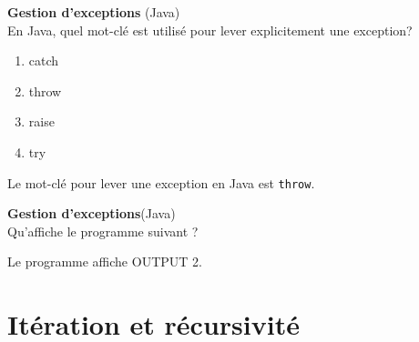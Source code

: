 \begin{Exercice}[5 minutes]\textbf{Gestion d'exceptions} (Java)\\

    En Java, quel mot-clé est utilisé pour lever explicitement une exception?

    \begin{enumerate}
        \item catch
        \item throw
        \item raise 
        \item try
    \end{enumerate}
    
    \begin{solution}   
    Le mot-clé pour lever une exception en Java est \lstinline{throw}.
        
    \end{solution}
        
 \end{Exercice}

 \begin{Exercice}[5 minutes]\textbf{Gestion d'exceptions}(Java)\\

    Qu'affiche le programme suivant ?
    

    
        
        \begin{solution}   
        Le programme affiche OUTPUT 2.             
        \end{solution}
        
 \end{Exercice}



    



\section{Itération et récursivité}

